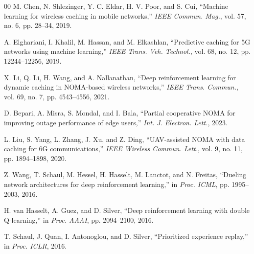 \documentclass[conference]{IEEEtran}
\begin{document}
\begin{thebibliography}{00}
M. Chen, N. Shlezinger, Y. C. Eldar, H. V. Poor, and S. Cui,
``Machine learning for wireless caching in mobile networks,''
\textit{IEEE Commun. Mag.}, vol. 57, no. 6, pp. 28--34, 2019.

A. Elghariani, I. Khalil, M. Hassan, and M. Elkashlan,
``Predictive caching for 5G networks using machine learning,''
\textit{IEEE Trans. Veh. Technol.}, vol. 68, no. 12, pp. 12244--12256, 2019.

X. Li, Q. Li, H. Wang, and A. Nallanathan,
``Deep reinforcement learning for dynamic caching in NOMA-based wireless networks,''
\textit{IEEE Trans. Commun.}, vol. 69, no. 7, pp. 4543--4556, 2021.

D. Bepari, A. Misra, S. Mondal, and I. Bala,
``Partial cooperative NOMA for improving outage performance of edge users,''
\textit{Int. J. Electron. Lett.}, 2023.

L. Liu, S. Yang, L. Zhang, J. Xu, and Z. Ding,
``UAV-assisted NOMA with data caching for 6G communications,''
\textit{IEEE Wireless Commun. Lett.}, vol. 9, no. 11, pp. 1894--1898, 2020.

Z. Wang, T. Schaul, M. Hessel, H. Hasselt, M. Lanctot, and N. Freitas,
``Dueling network architectures for deep reinforcement learning,''
in \textit{Proc. ICML}, pp. 1995--2003, 2016.

H. van Hasselt, A. Guez, and D. Silver,
``Deep reinforcement learning with double Q-learning,''
in \textit{Proc. AAAI}, pp. 2094--2100, 2016.

T. Schaul, J. Quan, I. Antonoglou, and D. Silver,
``Prioritized experience replay,''
in \textit{Proc. ICLR}, 2016.

\end{thebibliography}
\end{document}
